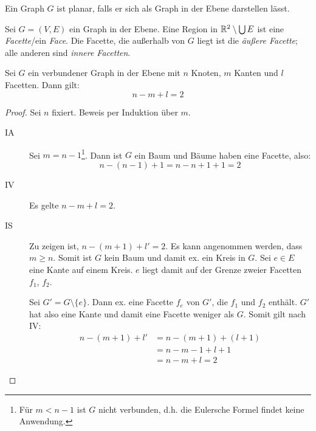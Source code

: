 \begin{definition}[Planar]
    Ein Graph $ G $ ist planar, falls er sich als Graph in der Ebene darstellen lässt.
\end{definition}

\begin{definition}
    Sei $ G = (V, E) $ ein Graph in der Ebene.
    Eine Region in $ \mathbb{R}^2 \setminus \bigcup E $ ist eine \textit{Facette}/ein \textit{Face}.
    Die Facette, die außerhalb von $ G $ liegt ist die \textit{äußere Facette}; alle anderen sind \textit{innere Facetten}.
\end{definition}

\begin{theorem}
    Sei $ G $ ein verbundener Graph in der Ebene mit $ n $ Knoten, $ m $ Kanten und $ l $ Facetten.
    Dann gilt:
    \begin{equation*}
        n - m + l = 2
    \end{equation*}
\end{theorem}

\begin{proof}
    Sei $ n $ fixiert.
    Beweis per Induktion über $ m $.
    \begin{description}
        \item[IA] Sei $ m = n - 1 $\footnote{%
            Für $ m < n - 1 $ ist $ G $ nicht verbunden, d.h. die Eulersche Formel findet keine Anwendung.
        }.
        Dann ist $ G $ ein Baum und Bäume haben eine Facette, also:
        \begin{equation*}
            n - (n - 1) + 1 = n - n + 1 + 1 = 2
        \end{equation*}
        \item[IV] Es gelte $ n - m + l = 2 $.
        \item[IS] Zu zeigen ist, $ n - (m + 1) + l' = 2 $.
        Es kann angenommen werden, dass $ m \geq n $.
        Somit ist $ G $ kein Baum und damit ex. ein Kreis in $ G $.
        Sei $ e \in E $ eine Kante auf einem Kreis.
        $ e $ liegt damit auf der Grenze zweier Facetten $ f_1 $, $ f_2 $.

        Sei $ G' = G \setminus \{ e \} $.
        Dann ex. eine Facette $ f_e $ von $ G' $, die $ f_1 $ und $ f_2 $ enthält.
        $ G' $ hat also eine Kante und damit eine Facette weniger als $ G $.
        Somit gilt nach IV:
        \begin{align*}
            n - (m + 1) + l' &= n - (m + 1) + (l + 1) \\
            &= n - m - 1 + l + 1 \\
            &= n - m + l = 2
        \end{align*}
    \end{description}
\end{proof}


